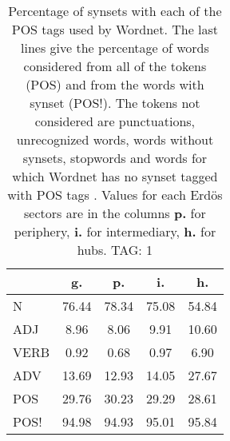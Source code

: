 \begin{table}[h!]
\begin{center}
\begin{tabular}{| l || c | c | c | c |}\hline
 & {\bf g.} & {\bf p.} & {\bf i.} & {\bf h.} \\\hline\hline
N & 76.44  & 78.34  & 75.08  & 54.84 \\\hline
ADJ & 8.96  & 8.06  & 9.91  & 10.60 \\\hline
VERB & 0.92  & 0.68  & 0.97  & 6.90 \\\hline
ADV & 13.69  & 12.93  & 14.05  & 27.67 \\\hline\hline
POS & 29.76  & 30.23  & 29.29  & 28.61 \\\hline
POS! & 94.98  & 94.93  & 95.01  & 95.84 \\\hline
\end{tabular}
\caption{Percentage of synsets with each of the POS tags used by Wordnet. The last lines give the percentage of words considered from all of the tokens (POS) and from the words with synset (POS!). The tokens not considered are punctuations, unrecognized words, words without synsets, stopwords and words for which Wordnet has no synset  tagged with POS tags . Values for each Erd\"os sectors are in the columns {{\bf p.}} for periphery, {{\bf i.}} for intermediary, {{\bf h.}} for hubs. TAG: 1}
\end{center}
\end{table}